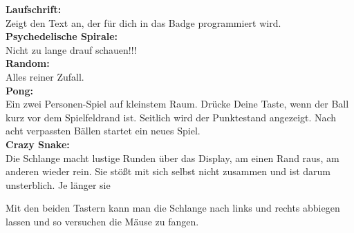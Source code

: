 \documentclass{article}
\begin{document}
\textbf{Laufschrift:}\\
Zeigt den Text an, der für dich in das Badge programmiert wird.\\

\textbf{Psychedelische Spirale:}\\
Nicht zu lange drauf schauen!!!\\

\textbf{Random:}\\
Alles reiner Zufall.\\

\textbf{Pong:}\\
Ein zwei Personen-Spiel auf kleinstem Raum. Drücke Deine Taste, wenn der Ball kurz vor dem Spielfeldrand ist. Seitlich wird der Punktestand angezeigt. Nach acht verpassten Bällen startet ein neues Spiel.\\

\textbf{Crazy Snake:}\\
Die Schlange macht lustige Runden über das Display, am einen Rand raus, am anderen wieder rein. Sie stößt mit sich selbst nicht zusammen und ist darum unsterblich. Je länger sie %

Mit den beiden Tastern kann man die Schlange nach links und rechts abbiegen lassen und so versuchen die Mäuse zu fangen.



\end{document}
